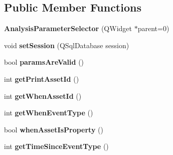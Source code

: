 \subsection*{Public Member Functions}
\begin{DoxyCompactItemize}
\item 
\hypertarget{class_analysis_parameter_selector_a7cc24ce1438a709ec8da8379757f108e}{{\bfseries Analysis\-Parameter\-Selector} (Q\-Widget $\ast$parent=0)}\label{class_analysis_parameter_selector_a7cc24ce1438a709ec8da8379757f108e}

\item 
\hypertarget{class_analysis_parameter_selector_a5589feab5dc4df5b04adbc7c7f6f51d1}{void {\bfseries set\-Session} (Q\-Sql\-Database session)}\label{class_analysis_parameter_selector_a5589feab5dc4df5b04adbc7c7f6f51d1}

\item 
\hypertarget{class_analysis_parameter_selector_ab8cb576e29e91caa157a44e54f489658}{bool {\bfseries params\-Are\-Valid} ()}\label{class_analysis_parameter_selector_ab8cb576e29e91caa157a44e54f489658}

\item 
\hypertarget{class_analysis_parameter_selector_a1bcfa19d648f1fe121e11cd840fe94d7}{int {\bfseries get\-Print\-Asset\-Id} ()}\label{class_analysis_parameter_selector_a1bcfa19d648f1fe121e11cd840fe94d7}

\item 
\hypertarget{class_analysis_parameter_selector_aa3f7b2c1db0fefe0876d3bf01de1b8ae}{int {\bfseries get\-When\-Asset\-Id} ()}\label{class_analysis_parameter_selector_aa3f7b2c1db0fefe0876d3bf01de1b8ae}

\item 
\hypertarget{class_analysis_parameter_selector_a8b6f7bc0dcc80090249d4447f29b41a8}{int {\bfseries get\-When\-Event\-Type} ()}\label{class_analysis_parameter_selector_a8b6f7bc0dcc80090249d4447f29b41a8}

\item 
\hypertarget{class_analysis_parameter_selector_aabf97c8da6de52877d0534358cdfd795}{bool {\bfseries when\-Asset\-Is\-Property} ()}\label{class_analysis_parameter_selector_aabf97c8da6de52877d0534358cdfd795}

\item 
\hypertarget{class_analysis_parameter_selector_a69e9d0e91271757ffd90499854aec2e5}{int {\bfseries get\-Time\-Since\-Event\-Type} ()}\label{class_analysis_parameter_selector_a69e9d0e91271757ffd90499854aec2e5}


\end{DoxyCompactItemize}
